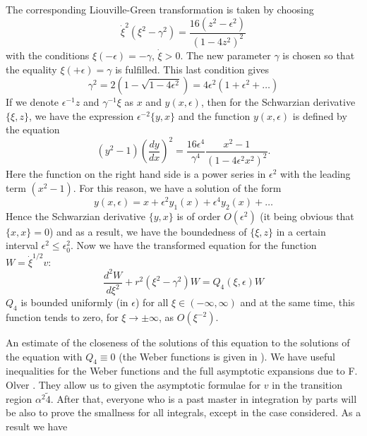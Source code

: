 The corresponding Liouville-Green transformation is taken by choosing
\begin{equation}
\dot{\xi}^2  (\xi^2 - \gamma^2) = \frac{16(z^2 - \epsilon^2)}{(1-4z^2)^2} \label{art7-eq7.48}
\end{equation}
with the conditions $\xi(-\epsilon) = - \gamma$, $\dot{\xi} >0$. The new parameter $\gamma$ is chosen so that the equality $\xi (+\epsilon) = \gamma$ is fulfilled. This last condition gives 
\begin{equation}
\gamma^2 = 2 (1-\sqrt{1-4\epsilon^2}) = 4 \epsilon^2 (1+ \epsilon^2 + \ldots) \label{art7-eq7.49}
\end{equation}
If we denote $\epsilon^{-1} z$ and $\gamma^{-1} \xi$ as $x$ and $y (x, \epsilon)$, then for the Schwarzian derivative $\{\xi, z\}$, we have the expression $\epsilon^{-2} \{y, x\}$ and the function $y(x, \epsilon)$ is defined by the equation 
\begin{equation}
(y^2 -1) \left(\frac{dy}{dx} \right)^2 = \frac{16\epsilon^4}{\gamma^4} \frac{x^2 -1}{(1-4 \epsilon^2 x^2)^2} . \label{art7-eq7.50}
\end{equation}
Here the function on the right hand side is a power series in $\epsilon^2$ with the leading term $(x^2 -1)$. For this reason, we have a solution of the form 
\begin{equation}
y (x, \epsilon) = x + \epsilon^2 y_1 (x) + \epsilon^4 y_2 (x) + \ldots \label{art7-eq7.51}
\end{equation}
Hence the Schwarzian derivative $\{y, x\}$ is of order $O(\epsilon^2)$ (it being obvious that $\{x, x\} =0$) and as a result, we have the boundedness of $\{\xi, z\}$ in a certain interval $\epsilon^2 \leqslant \epsilon^2_0$. Now we have the transformed equation for the function $W = \dot{\xi}^{1/2} v$:
\begin{equation}
\frac{d^2 W}{d\xi^2} + r^2 (\xi^2 - \gamma^2) W = Q_4 (\xi, \epsilon) W \label{art7-eq7.52}
\end{equation}
 $Q_4$ is bounded uniformly (in $\epsilon$) for all $\xi \in (-\infty, \infty)$ and at the same time, this function tends to zero, for $\xi \to \pm \infty$, as $O(\xi^{-2})$.

An estimate of the closeness of the solutions of this equation to the solutions of the equation with $Q_4 \equiv 0$ (the Weber functions is given  in \cite{art7-key7}). We have useful inequalities for the Weber functions and the full asymptotic expansions due to F. Olver \cite{art7-key8}. They allow us to given the asymptotic formulae for $v$ in the transition region $\alpha^2 \tilde 4$. After that, everyone who is a past master in integration by parts will be also to prove the smallness for all integrals, except in the case considered. As a result we have 

